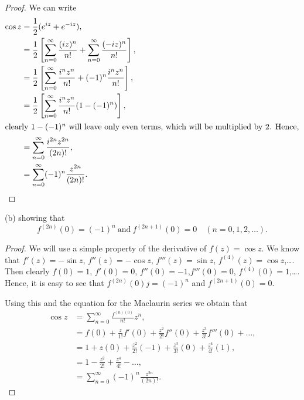 \documentclass{article}
\begin{document}
\begin{proof}
    We can write
    \begin{align*}
        \cos z & = \frac{1}{2} (e^{iz} + e^{-iz}),                                      \\
               & = \frac{1}{2} \left[\sum_{n=0}^\infty \frac{(iz)^n}{n!} +
        \sum_{n=0}^\infty \frac{(-iz)^n}{n!}\right],                                    \\
               & =\frac{1}{2}\left[\sum_{n=0}^\infty \frac{i^nz^n}{n!} +
        (-1)^n\frac{i^nz^n}{n!} \right],                                                \\
               & =\frac{1}{2}\left[\sum_{n=0}^\infty\frac{i^nz^n}{n!}(1-(-1)^n)\right], \\
        \intertext{clearly $1 - (-1)^n$ will leave only even terms, which will
            be multiplied by $2$. Hence,}
               & =\sum_{n=0}^\infty \frac{i^{2n}z^{2n}}{(2n)!},                         \\
               & = \sum_{n=0}^\infty (-1)^n \frac{z^{2n}}{(2n)!}.
    \end{align*}
\end{proof}

(b) showing that
\begin{equation*}
    f^{(2n)}(0) = (-1)^n \ \text{and} \ f^{(2n+1)}(0) = 0 \quad (n = 0,1,2,\dots).
\end{equation*}

\begin{proof}
    We will use a simple property of the derivative of $f(z) = \cos z$. We know
    that $f'(z) = -\sin z$, $f''(z) = -\cos z$, $f'''(z) = \sin z$,
    $f^{(4)}(z) = \cos z$,\dots. Then clearly
    $f(0) = 1$, $f'(0) = 0$, $f''(0)=-1$,$f'''(0) = 0$, $f^{(4)}(0) = 1$,\dots.
    Hence, it is easy to see that $f^{(2n)}(0)j=(-1)^n$ and $f^{(2n+1)}(0) = 0$.

    Using this and the equation for the Maclaurin series we obtain that
    \begin{align*}
        \cos z & = \sum_{n=0}^\infty \frac{f^{(n)(0)}}{n!}z^n,                            \\
               & = f(0) + \frac{z}{1!}f'(0) + \frac{z^2}{2!}f''(0) +
        \frac{z^3}{3!}f'''(0) + \dots,                                                    \\
               & = 1 + z(0) + \frac{z^2}{2!}(-1) + \frac{z^3}{3!}(0) + \frac{z^4}{4!}(1), \\
               & = 1 - \frac{z^2}{2!} + \frac{z^4}{4!}-\dots,                             \\
               & =  \sum_{n=0}^\infty (-1)^n\frac{z^{2n}}{(2n)!}.
    \end{align*}
\end{proof}
\end{document}
